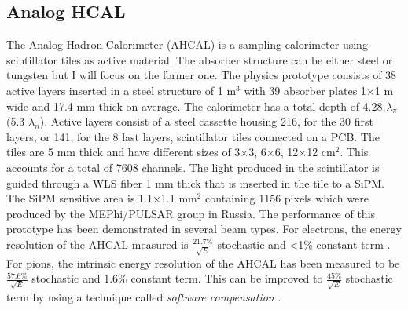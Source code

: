 \subsection{Analog HCAL}
\label{subsec:AHCAL}

The Analog Hadron Calorimeter (AHCAL) is a sampling calorimeter using scintillator tiles as active material. The absorber structure can be either steel or tungsten but I will focus on the former one. The physics prototype \cite{1748-0221-5-05-P05004} consists of 38 active layers inserted in a steel structure of 1 m$^3$ with 39 absorber plates 1$\times$1 m wide and 17.4 mm thick on average. The calorimeter has a total depth of 4.28 $\lambda_{\pi}$ (5.3 $\lambda_{n}$). Active layers consist of a steel cassette housing 216, for the 30 first layers, or 141, for the 8 last layers, scintillator tiles connected on a PCB. The tiles are 5 mm thick and have different sizes of 3$\times$3, 6$\times$6, 12$\times$12 cm$^2$. This accounts for a total of 7608 channels. The light produced in the scintillator is guided through a WLS fiber 1 mm thick that is inserted in the tile to a SiPM. The SiPM sensitive area is 1.1$\times$1.1 mm$^2$ containing 1156 pixels which were produced by the MEPhi/PULSAR group in Russia. The performance of this prototype has been demonstrated in several beam types. For electrons, the energy resolution of the AHCAL measured is $\frac{21.7\%}{\sqrt{E}}$ stochastic and <1\% constant term \cite{CAN034}. For pions, the intrinsic energy resolution of the AHCAL has been measured to be $\frac{57.6\%}{\sqrt{E}}$ stochastic and 1.6\% constant term. This can be improved to $\frac{45\%}{\sqrt{E}}$ stochastic term by using a technique called \textit{software compensation} \cite{SoftCompNew2012}.

